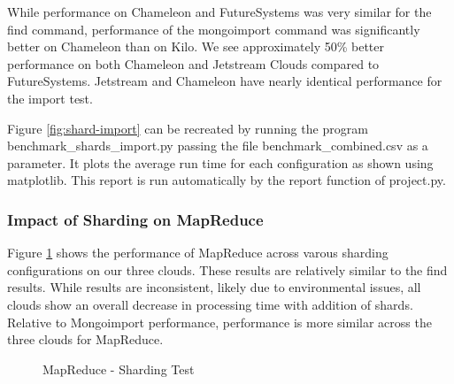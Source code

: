 \documentclass[9pt,twocolumn,twoside]{../../styles/osajnl}
\begin{document}
While performance on Chameleon and FutureSystems was very similar for the find command, performance of the mongoimport command was significantly better on Chameleon than on Kilo.  We see approximately 50\% better performance on both Chameleon and Jetstream Clouds compared to FutureSystems. Jetstream and Chameleon have nearly identical performance for the import test.

Figure \ref{fig:shard-import} can be recreated by running the program benchmark\_shards\_import.py passing the file benchmark\_combined.csv as a parameter.  It plots the average run time for each configuration as shown using matplotlib.    This report is run automatically by the report function of project.py.

\subsubsection{Impact of Sharding on MapReduce}



Figure \ref{fig:shard-mapreduce} shows the performance of MapReduce across varous sharding configurations on our three clouds.  These results are relatively similar to the find results.  While results are inconsistent, likely due to environmental issues, all clouds show an overall decrease in processing time with addition of shards.  Relative to Mongoimport performance, performance is more similar across the three clouds for MapReduce.

\begin{figure}[htbp]
\centering
{}
\caption{MapReduce - Sharding Test}
\label{fig:shard-mapreduce}
\end{figure}
\end{document}
